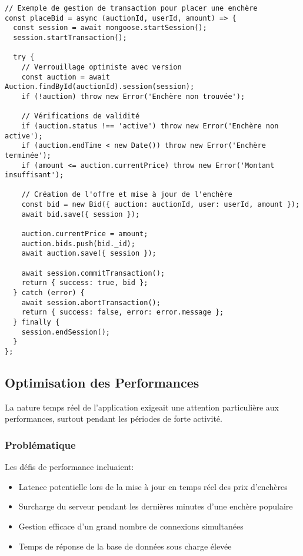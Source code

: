 \begin{verbatim}
// Exemple de gestion de transaction pour placer une enchère
const placeBid = async (auctionId, userId, amount) => {
  const session = await mongoose.startSession();
  session.startTransaction();
  
  try {
    // Verrouillage optimiste avec version
    const auction = await Auction.findById(auctionId).session(session);
    if (!auction) throw new Error('Enchère non trouvée');
    
    // Vérifications de validité
    if (auction.status !== 'active') throw new Error('Enchère non active');
    if (auction.endTime < new Date()) throw new Error('Enchère terminée');
    if (amount <= auction.currentPrice) throw new Error('Montant insuffisant');
    
    // Création de l'offre et mise à jour de l'enchère
    const bid = new Bid({ auction: auctionId, user: userId, amount });
    await bid.save({ session });
    
    auction.currentPrice = amount;
    auction.bids.push(bid._id);
    await auction.save({ session });
    
    await session.commitTransaction();
    return { success: true, bid };
  } catch (error) {
    await session.abortTransaction();
    return { success: false, error: error.message };
  } finally {
    session.endSession();
  }
};
\end{verbatim}

\subsection{Optimisation des Performances}
La nature temps réel de l'application exigeait une attention particulière aux performances, surtout pendant les périodes de forte activité.

\subsubsection{Problématique}
Les défis de performance incluaient:
\begin{itemize}
    \item Latence potentielle lors de la mise à jour en temps réel des prix d'enchères
    \item Surcharge du serveur pendant les dernières minutes d'une enchère populaire
    \item Gestion efficace d'un grand nombre de connexions simultanées
    \item Temps de réponse de la base de données sous charge élevée
\end{itemize}

